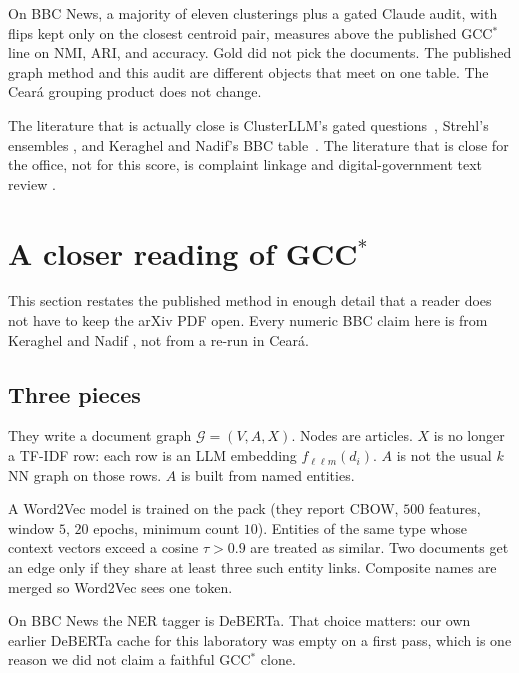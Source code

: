 \documentclass[11pt,a4paper]{article}
\begin{document}
On BBC News, a majority of eleven clusterings plus a gated
Claude audit, with flips kept only on the closest centroid
pair, measures above the published GCC$^*$ line on NMI, ARI,
and accuracy. Gold did not pick the documents. The published
graph method and this audit are different objects that meet
on one table. The Cear\'{a} grouping product does not change.

The literature that is actually close is ClusterLLM's gated
questions~\cite{zhang2023clusterllm}, Strehl's ensembles
\cite{strehl2002cluster}, and Keraghel and Nadif's BBC
table~\cite{keraghel2024gcc}. The literature that is close
for the office, not for this score, is complaint linkage
and digital-government text review
\cite{romberg2023citizens,rabbi2026duplicate}.

\section{A closer reading of GCC$^*$}

This section restates the published method in enough detail that
a reader does not have to keep the arXiv PDF open. Every
numeric BBC claim here is from Keraghel and Nadif
\cite{keraghel2024gcc}, not from a re-run in Cear\'{a}.

\subsection{Three pieces}

They write a document graph $\mathcal{G}=(V,A,X)$. Nodes are
articles. $X$ is no longer a TF-IDF row: each row is an LLM
embedding $f_{\ell\ell m}(d_i)$. $A$ is not the usual $k$NN
graph on those rows. $A$ is built from named entities.

A Word2Vec model is trained on the pack (they report CBOW,
$500$ features, window $5$, $20$ epochs, minimum count $10$).
Entities of the same type whose context vectors exceed a
cosine $\tau>0.9$ are treated as similar. Two documents get
an edge only if they share at least three such entity links.
Composite names are merged so Word2Vec sees one token.

On BBC News the NER tagger is DeBERTa. That choice matters:
our own earlier DeBERTa cache for this laboratory was empty
on a first pass, which is one reason we did not claim a
faithful GCC$^*$ clone.
\end{document}
